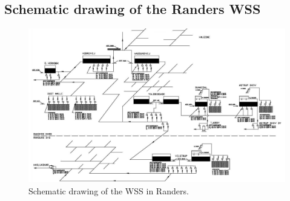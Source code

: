 \begin{landscape}

\chapter{Schematic drawing of the Randers WSS}
\label{schematic_WSS}

\thispagestyle{empty}
\vspace{-7mm}
\begin{figure}[H]
\centering
\includegraphics[width=1.27\textwidth]{report/pictures/cad_drawing_1}
\vspace{-3mm}
\caption{Schematic drawing of the WSS in Randers.}
\label{fig:schematic_CAD}
\end{figure}

 \vfill
 \raisebox{0pt}{\makebox[\linewidth]{\thepage}}
\end{landscape}